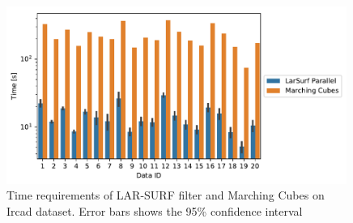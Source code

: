 \begin{figure}
\includegraphics[width=0.99\textwidth]{figs/ircad_comparison.pdf} 
\caption{Time requirements of LAR-SURF filter and Marching Cubes on Ircad dataset. Error bars shows the 95\% confidence interval}
\label{fig:ircad_comparison}
\end{figure}